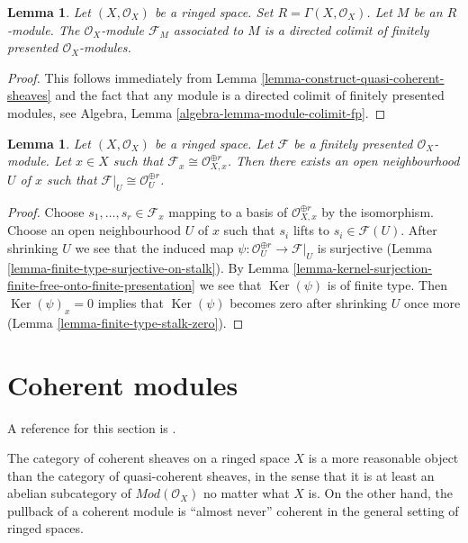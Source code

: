 \documentclass{stacks-project}
\theoremstyle{plain}
\newtheorem{lemma}[subsection]{Lemma}
\theoremstyle{definition}
\theoremstyle{remark}
\numberwithin{equation}{subsection}
\def\Ker{\mathop{\mathrm{Ker}}}
\begin{document}
\begin{lemma}
\label{lemma-quasi-coherent-limit-finite-presentation}
Let $(X, \mathcal{O}_X)$ be a ringed space.
Set $R = \Gamma(X, \mathcal{O}_X)$.
Let $M$ be an $R$-module.
The $\mathcal{O}_X$-module $\mathcal{F}_M$ associated to $M$
is a directed colimit of finitely presented $\mathcal{O}_X$-modules.
\end{lemma}

\begin{proof}
This follows immediately from
Lemma \ref{lemma-construct-quasi-coherent-sheaves}
and the fact that any module is a directed colimit
of finitely presented modules, see
Algebra, Lemma \ref{algebra-lemma-module-colimit-fp}.
\end{proof}

\begin{lemma}
\label{lemma-finite-presentation-stalk-free}
Let $(X, \mathcal{O}_X)$ be a ringed space. Let $\mathcal{F}$ be
a finitely presented $\mathcal{O}_X$-module. Let $x \in X$ such that
$\mathcal{F}_x \cong \mathcal{O}_{X, x}^{\oplus r}$. Then there exists
an open neighbourhood $U$ of $x$ such that
$\mathcal{F}|_U \cong \mathcal{O}_U^{\oplus r}$.
\end{lemma}

\begin{proof}
Choose $s_1, \ldots, s_r \in \mathcal{F}_x$ mapping to a basis of
$\mathcal{O}_{X, x}^{\oplus r}$ by the isomorphism. Choose an open
neighbourhood $U$ of $x$ such that $s_i$ lifts to $s_i \in \mathcal{F}(U)$.
After shrinking $U$ we see that the induced map
$\psi : \mathcal{O}_U^{\oplus r} \to \mathcal{F}|_U$ is surjective
(Lemma \ref{lemma-finite-type-surjective-on-stalk}).
By Lemma \ref{lemma-kernel-surjection-finite-free-onto-finite-presentation}
we see that $\Ker(\psi)$ is of finite type.
Then $\Ker(\psi)_x = 0$ implies that $\Ker(\psi)$ becomes zero
after shrinking $U$ once more (Lemma \ref{lemma-finite-type-stalk-zero}).
\end{proof}





\section{Coherent modules}
\label{section-coherent}

\noindent
A reference for this section is \cite{FAC}.

\medskip\noindent
The category of coherent sheaves on a ringed space $X$
is a more reasonable object
than the category of quasi-coherent sheaves, in the sense
that it is at least an abelian subcategory of $\textit{Mod}(\mathcal{O}_X)$
no matter what $X$ is. On the other hand, the pullback of a
coherent module is ``almost never'' coherent in the general setting
of ringed spaces.
\end{document}

